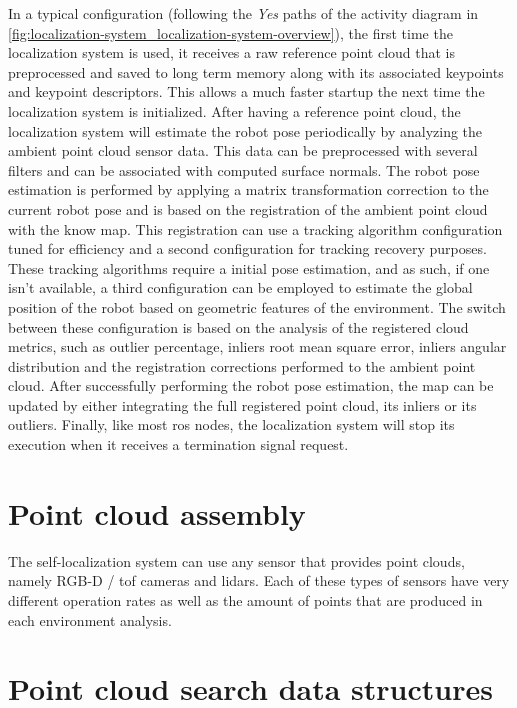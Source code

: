 In a typical configuration (following the \emph{Yes} paths of the activity diagram in \cref{fig:localization-system_localization-system-overview}), the first time the localization system is used, it receives a raw reference point cloud that is preprocessed and saved to long term memory along with its associated keypoints and keypoint descriptors. This allows a much faster startup the next time the localization system is initialized. After having a reference point cloud, the localization system will estimate the robot pose periodically by analyzing the ambient point cloud sensor data. This data can be preprocessed with several filters and can be associated with computed surface normals. The robot pose estimation is performed by applying a matrix transformation correction to the current robot pose and is based on the registration of the ambient point cloud with the know map. This registration can use a tracking algorithm configuration tuned for efficiency and a second configuration for tracking recovery purposes. These tracking algorithms require a initial pose estimation, and as such, if one isn't available, a third configuration can be employed to estimate the global position of the robot based on geometric features of the environment. The switch between these configuration is based on the analysis of the registered cloud metrics, such as outlier percentage, inliers root mean square error, inliers angular distribution and the registration corrections performed to the ambient point cloud. After successfully performing the robot pose estimation, the map can be updated by either integrating the full registered point cloud, its inliers or its outliers. Finally, like most \gls{ros} nodes, the localization system will stop its execution when it receives a termination signal request.



\section{Point cloud assembly}

The self-localization system can use any sensor that provides point clouds, namely RGB-D / \gls{tof} cameras and \glspl{lidar}. Each of these types of sensors have very different operation rates as well as the amount of points that are produced in each environment analysis.



\section{Point cloud search data structures}


